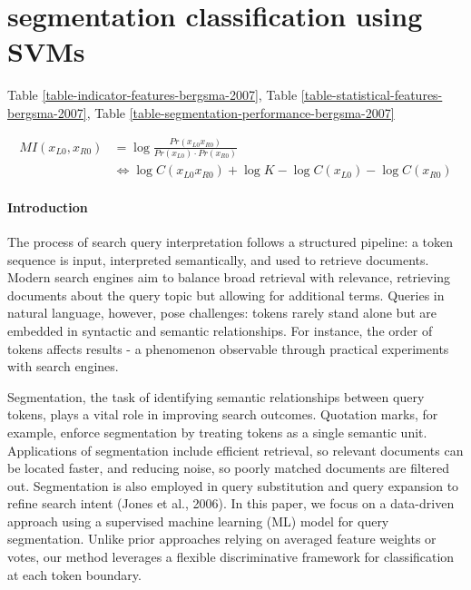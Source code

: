 \section{segmentation classification using SVMs} \label{approach2}





Table \ref{table-indicator-features-bergsma-2007}, 
Table \ref{table-statistical-features-bergsma-2007},
Table \ref{table-segmentation-performance-bergsma-2007}\\

\cite{Nakov:2005}
\cite{Keller:2003}
\cite{Lauer:1995}
\cite{Nicholson:2005}

\begin{align*}
MI(x_{L0},x_{R0}) &= \log \frac{Pr(x_{L0}x_{R0})}{Pr(x_{L0}) \cdot Pr(x_{R0})} \\
&\Leftrightarrow \log C(x_{L0}x_{R0}) + \log K - \log C(x_{L0}) - \log C(x_{R0})
\end{align*}

\paragraph*{Introduction}
The process of search query interpretation follows a structured pipeline: a token sequence is input, interpreted semantically, and used to retrieve documents. Modern search engines aim to balance broad retrieval with relevance, retrieving documents about the query topic but allowing for additional terms. Queries in natural language, however, pose challenges: tokens rarely stand alone but are embedded in syntactic and semantic relationships. For instance, the order of tokens affects results - a phenomenon observable through practical experiments with search engines.

Segmentation, the task of identifying semantic relationships between query tokens, plays a vital role in improving search outcomes. Quotation marks, for example, enforce segmentation by treating tokens as a single semantic unit. Applications of segmentation include efficient retrieval, so relevant documents can be located faster, and reducing noise, so poorly matched documents are filtered out. Segmentation is also employed in query substitution and query expansion to refine search intent (Jones et al., 2006). In this paper, we focus on a data-driven approach using a supervised machine learning (ML) model for query segmentation. Unlike prior approaches relying on averaged feature weights or votes, our method leverages a flexible discriminative framework for classification at each token boundary.

